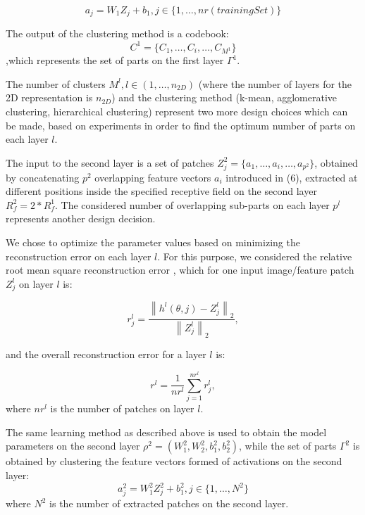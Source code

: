\documentclass[runningheads]{llncs}
\begin{document}
\begin{equation}
a_j=W_1Z_j+b_1, j\in\{1,\ldots,nr(trainingSet)\}
\end{equation}

The output of the clustering method is a codebook:
\begin{equation}
C^1=\{C_1,\ldots,C_i,\ldots,C_{M^1}\}
\end{equation}
,which represents the set of parts on the first layer $\Gamma^{1}$. 

The number of clusters $M^l, l\in (1,\ldots,n_{2D})$ (where the number of layers for the 2D representation is $n_{2D}$) and the clustering method (k-mean, agglomerative clustering, hierarchical clustering) represent two more design choices which can be made, based on experiments in order to find the optimum number of parts on each layer $l$. 

The input to the second layer is a set of patches $Z_j^2=\{a_1,\ldots,a_i,\ldots,a_{p^2}\}$, obtained by concatenating  $p^2$ overlapping feature vectors $a_i$ introduced in (6), extracted at different positions inside the specified receptive field on the second layer $R_f^2=2*R_f^1$. The considered number of overlapping sub-parts on each layer $p^l$ represents another design decision.

We chose to optimize the parameter values based on minimizing the reconstruction error on each layer $l$. For this purpose, we considered the relative root mean square reconstruction error \cite{Chai2014}, which for one input image/feature patch $Z_j^l$ on layer $l$ is:

\begin{equation}
 r_j^l = \frac{\left\|h^l(\theta,j)-Z_j^l\right\|_2}{\left\|Z_j^l\right\|_2},
\end{equation}

and the overall reconstruction error for a layer $l$ is:

\begin{equation}
  r^l = \frac{1}{nr^l} \sum_{j=1}^{nr^l} r_j^l,
  \label{eq:r}
\end{equation}
where $nr^l$ is the number of patches on layer $l$.

The same learning method as described above is used to obtain the model parameters on the second layer $\rho^2=(W_1^2,W_2^2,b_1^2,b_2^2)$, while the set of parts $\Gamma^{2}$ is obtained by clustering the feature vectors formed of activations on the second layer:
\begin{equation}
a_j^2=W_1^2Z_j^2+b_1^2, j\in\{1,\ldots,N^2\}
\end{equation}
where $N^2$ is the number of extracted patches on the second layer.
\end{document}

